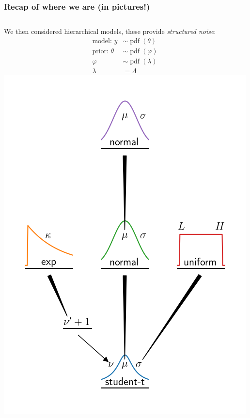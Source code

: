 \documentclass[usenames,dvipsnames,table]{beamer}
\begin{document}
\begin{frame}
\frametitle{Recap of where we are (in pictures!)}
\begin{columns}
We then considered hierarchical models, these provide \emph{structured noise}:
\begin{align*}
\textrm{model: } y      &\sim \operatorname{pdf}(\theta) \\
\textrm{prior: } \theta &\sim \operatorname{pdf}(\varphi) \\
                   \varphi &\sim \operatorname{pdf}(\lambda) \\
                   \lambda &= \Lambda
\end{align*}
\includegraphics[width=\textwidth]{img/progress-hierarchical}
\end{columns}
\end{frame}
\end{document}
